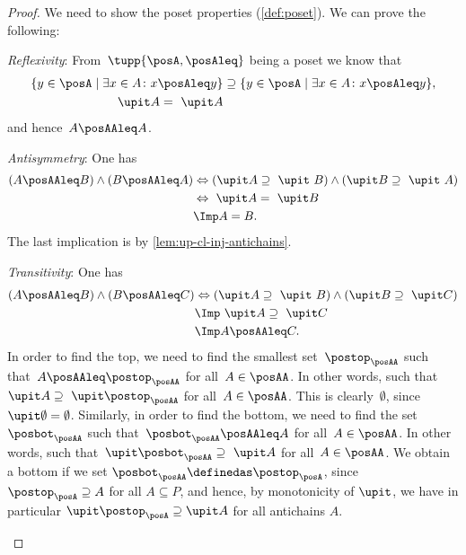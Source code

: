\begin{proof}
  We need to show the poset properties (\cref{def:poset}).
  We can prove the following:
%
  \begin{compactitem}
    \item \emph{Reflexivity}: From~$\tupp{\posA,\posAleq}$ being a poset we know that
    \begin{equation}
      \begin{aligned}
        \{y\in \posA \mid \exists x\in A \colon x\posAleq y\} &\supseteq \{y\in \posA \mid \exists x\in A \colon x\posAleq y\},\\
        \upit  A =\ \upit  A
      \end{aligned}
    \end{equation}
    and hence~$A\posAAleq A$.
%
    \item \emph{Antisymmetry}: One has
    \begin{equation}
      \begin{aligned}
        \left(A\posAAleq B\right) \wedge \left(B\posAAleq A\right)
        &\Leftrightarrow \left(\upit  A \supseteq \ \upit  \ B\right) \wedge \left( \upit   B\supseteq \ \upit  \ A\right)\\
        &\Leftrightarrow \ \upit  A= \ \upit  B \\
        & \Imp A = B.
      \end{aligned}
    \end{equation}
    The last implication is by  \cref{lem:up-cl-inj-antichains}.
%
    \item \emph{Transitivity}: One has
    \begin{equation}
      \begin{aligned}
        \left(A\posAAleq B\right) \wedge \left(B\posAAleq C\right)&\Leftrightarrow  \left(\upit  A \supseteq \ \upit  \ B\right) \wedge \left( \upit   B\supseteq \ \upit  C\right)\\
        &\Imp \ \upit  A\supseteq \ \upit  C\\
        &\Imp A\posAAleq C.
      \end{aligned}
    \end{equation}
    In order to find the top, we need to find the smallest set~$\postop_{\posAA}$ such that~$A\posAAleq \postop_{\posAA}$ for all~$A\in \posAA$.
    In other words, such that~$\upit  A\supseteq \ \upit  \postop_{\posAA}$ for all~$A\in \posAA$. This is clearly~$\emptyset$, since~$\upit  \emptyset = \emptyset$.
    Similarly, in order to find the bottom, we need to find the set~$\posbot_{\posAA}$ such that~$\posbot_{\posAA} \posAAleq A$ for all~$A\in \posAA$.
    In other words, such that~$\upit  \posbot_{\posAA} \supseteq \ \upit  A$ for all~$A\in \posAA$. We obtain a bottom if we set $\posbot_{\posAA} \definedas \postop_{\posA}$, since $\postop_{\posA} \supseteq A$ for all $A \subseteq P$, and hence, by monotonicity of $\upit $, we have in particular $\upit  \postop_{\posA} \supseteq \upit  A$ for all antichains $A$.
  \end{compactitem}
\end{proof}



